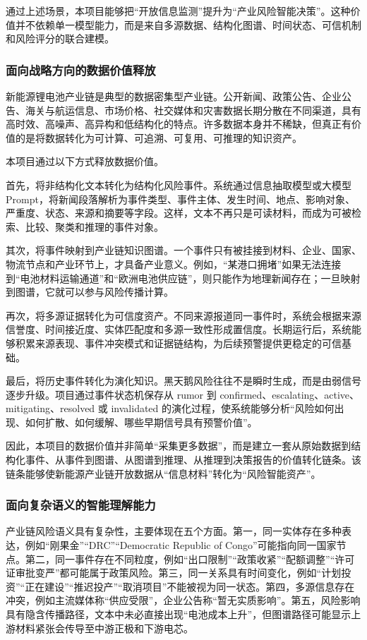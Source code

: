 ﻿\documentclass[12pt,a4paper]{article}
\begin{document}
通过上述场景，本项目能够把“开放信息监测”提升为“产业风险智能决策”。这种价值并不依赖单一模型能力，而是来自多源数据、结构化图谱、时间状态、可信机制和风险评分的联合建模。

\subsubsection{面向战略方向的数据价值释放}

新能源锂电池产业链是典型的数据密集型产业链。公开新闻、政策公告、企业公告、海关与航运信息、市场价格、社交媒体和灾害数据长期分散在不同渠道，具有高时效、高噪声、高异构和低结构化的特点。许多数据本身并不稀缺，但真正有价值的是将数据转化为可计算、可追溯、可复用、可推理的知识资产。

本项目通过以下方式释放数据价值。

首先，将非结构化文本转化为结构化风险事件。系统通过信息抽取模型或大模型 Prompt，将新闻段落解析为事件类型、事件主体、发生时间、地点、影响对象、严重度、状态、来源和摘要等字段。这样，文本不再只是可读材料，而成为可被检索、比较、聚类和推理的事件对象。

其次，将事件映射到产业链知识图谱。一个事件只有被挂接到材料、企业、国家、物流节点和产业环节上，才具备产业意义。例如，“某港口拥堵”如果无法连接到“电池材料运输通道”和“欧洲电池供应链”，则只能作为地理新闻存在；一旦映射到图谱，它就可以参与风险传播计算。

再次，将多源证据转化为可信度资产。不同来源报道同一事件时，系统会根据来源信誉度、时间接近度、实体匹配度和多源一致性形成置信度。长期运行后，系统能够积累来源表现、事件冲突模式和证据链结构，为后续预警提供更稳定的可信基础。

最后，将历史事件转化为演化知识。黑天鹅风险往往不是瞬时生成，而是由弱信号逐步升级。项目通过事件状态机保存从 rumor 到 confirmed、escalating、active、mitigating、resolved 或 invalidated 的演化过程，使系统能够分析“风险如何出现、如何扩散、如何缓解、哪些早期信号具有预警价值”。

因此，本项目的数据价值并非简单“采集更多数据”，而是建立一套从原始数据到结构化事件、从事件到图谱、从图谱到推理、从推理到决策报告的价值转化链条。该链条能够使新能源产业链开放数据从“信息材料”转化为“风险智能资产”。

\subsubsection{面向复杂语义的智能理解能力}

产业链风险语义具有复杂性，主要体现在五个方面。第一，同一实体存在多种表达，例如“刚果金”“DRC”“Democratic Republic of Congo”可能指向同一国家节点。第二，同一事件存在不同粒度，例如“出口限制”“政策收紧”“配额调整”“许可证审批变严”都可能属于政策风险。第三，同一关系具有时间变化，例如“计划投资”“正在建设”“推迟投产”“取消项目”不能被视为同一状态。第四，多源信息存在冲突，例如主流媒体称“供应受限”，企业公告称“暂无实质影响”。第五，风险影响具有隐含传播路径，文本中未必直接出现“电池成本上升”，但图谱路径可能显示上游材料紧张会传导至中游正极和下游电芯。
\end{document}
